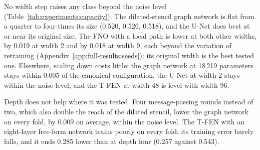 

No width step raises any class beyond the noise level
(Table~\ref{tab:experiments:capacity}). The dilated-stencil graph network
is flat from a quarter to four times its size (0.520, 0.526, 0.518), and
the U-Net does best at or near its original size. The FNO with a local
path is lower at both other widths, by 0.019 at width 2 and by 0.018 at
width 9, each beyond the variation of retraining
(Appendix~\ref{app:full-results:seeds}); its original width is the best
tested one. Elsewhere, scaling down costs little: the graph network at
18\,219 parameters stays within 0.005 of the canonical configuration, the
U-Net at width 2 stays within the noise level, and the T-FEN at width 48
is level with width 96.

Depth does not help where it was tested. Four message-passing rounds
instead of two, which also double the reach of the dilated stencil, lower
the graph network on every fold, by 0.009 on average, within the noise
level. The T-FEN with an eight-layer free-form network trains poorly on
every fold: its training error barely falls, and it ends 0.285 lower than
at depth four (0.257 against 0.543).

